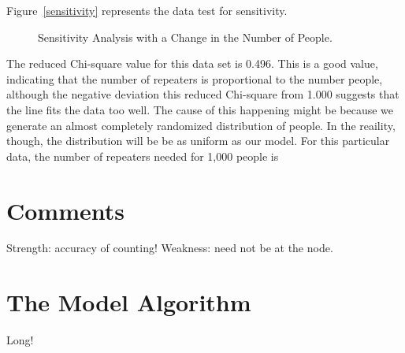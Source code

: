 \documentclass{icmmcm}
\begin{document}
Figure~\ref{sensitivity} represents the data test for sensitivity.
\begin{figure}[ht]
\begin{center}
\end{center}
\caption[Sensitivity of the Model]{Sensitivity Analysis with a Change in the Number of People.\label{sensitivity}}%
\label{fig:sensitivity}
\end{figure}
The reduced Chi-square value for this data set is 0.496. This is a good value, indicating that the number of repeaters is proportional to the number people, although the negative deviation this reduced Chi-square from 1.000 suggests that the line fits the data too well. The cause of this happening might be because we generate an almost completely randomized distribution of people. In the reaility, though, the distribution will be be as uniform as our model. For this particular data, the number of repeaters needed for 1,000 people is 
\section{Comments}
Strength: accuracy of counting!
Weakness: need not be at the node.

\section{The Model Algorithm}
Long!
\end{document}
